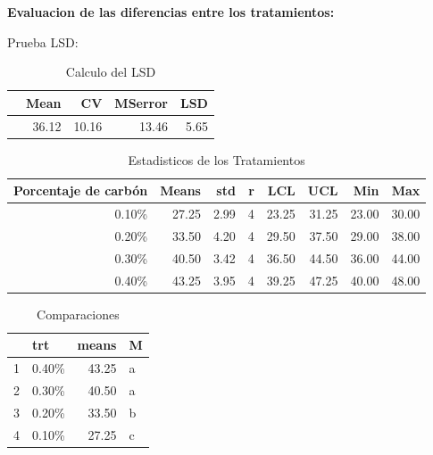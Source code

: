 \documentclass[12pt,letterpaper]{report}
\begin{document}
\textbf{Evaluacion de las diferencias entre los tratamientos:}

Prueba LSD:
\begin{Schunk}
\end{Schunk}

\begin{table}[ht]
\centering
\begin{tabular}{rrrrr}
  \hline
 & Mean & CV & MSerror & LSD \\ 
  \hline
  & 36.12 & 10.16 & 13.46 & 5.65 \\ 
   \hline
\end{tabular}
\caption{Calculo del LSD}
\end{table}

\begin{table}[ht]
\centering
\begin{tabular}{rrrrrrrr}
  \hline
Porcentaje de carbón  & Means & std & r & LCL & UCL & Min & Max \\ 
  \hline
0.10\% & 27.25 & 2.99 &   4 & 23.25 & 31.25 & 23.00 & 30.00 \\ 
  0.20\% & 33.50 & 4.20 &   4 & 29.50 & 37.50 & 29.00 & 38.00 \\ 
  0.30\% & 40.50 & 3.42 &   4 & 36.50 & 44.50 & 36.00 & 44.00 \\ 
  0.40\% & 43.25 & 3.95 &   4 & 39.25 & 47.25 & 40.00 & 48.00 \\ 
   \hline
\end{tabular}
\caption{Estadisticos de los Tratamientos}
\end{table}

\begin{table}[ht]
\centering
\begin{tabular}{rlrl}
  \hline
 & trt & means & M \\ 
  \hline
  1 & 0.40\% & 43.25 & a \\ 
  2 & 0.30\% & 40.50 & a \\ 
  3 & 0.20\% & 33.50 & b \\ 
  4 & 0.10\% & 27.25 & c \\ 
   \hline
\end{tabular}
\caption{Comparaciones}
\end{table}
\end{document}
